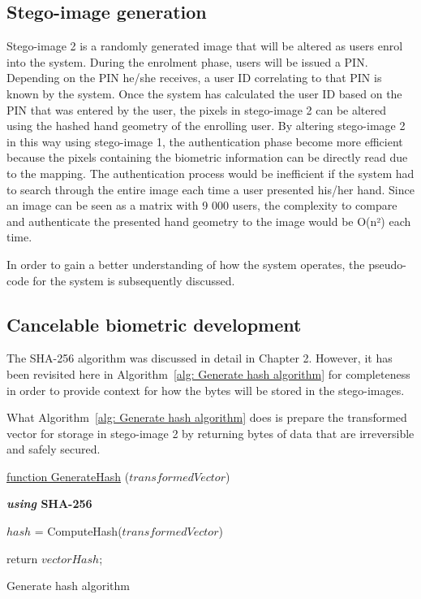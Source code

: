 \subsection{Stego-image generation}

Stego-image 2 is a randomly generated image that will be altered as users enrol into the system. During the enrolment phase, users will be issued a PIN. Depending on the PIN he/she receives, a user ID correlating to that PIN is known by the system. Once the system has calculated the user ID based on the PIN that was entered by the user, the pixels in stego-image 2 can be altered using the hashed hand geometry of the enrolling user. By altering stego-image 2 in this way using stego-image 1, the authentication phase become more efficient because the pixels containing the biometric information can be directly read due to the mapping. The authentication process would be inefficient if the system had to search through the entire image each time a user presented his/her hand. Since an image can be seen as a matrix with 9 000 users, the complexity to compare and authenticate the presented hand geometry to the image would be O(n²) each time. 

In order to gain a better understanding of how the system operates, the pseudo-code for the system is subsequently discussed.

\subsection{Cancelable biometric development}

The SHA-256 algorithm was discussed in detail in Chapter 2. However, it has been revisited here in Algorithm~\ref{alg: Generate hash algorithm} for completeness in order to provide context for how the bytes will be stored in the stego-images.

What Algorithm~\ref{alg: Generate hash algorithm} does is prepare the transformed vector for storage in stego-image 2 by returning bytes of data that are irreversible and safely secured.

\begin{algorithm}
     
     \underline{function GenerateHash} ($transformedVector$)\;
     
     \textbf{\textit{using} SHA-256}{
        $hash$ = ComputeHash($transformedVector$)\;
        
    
     }
     return $vectorHash$;
     \caption{Generate hash algorithm}
     \label{alg: Generate hash algorithm}
     
\end{algorithm}

